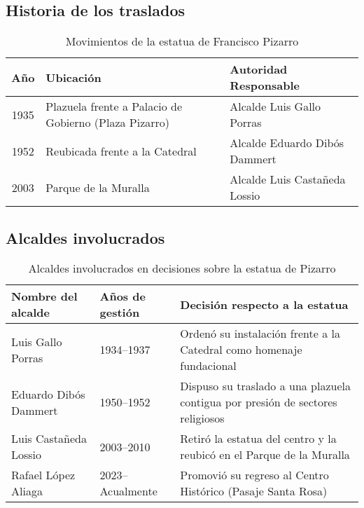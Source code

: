 \documentclass[a4paper,12pt]{article}
\begin{document}
	\subsection{Historia de los traslados}
	
	\begin{table}[htbp]
		\centering
		\caption{Movimientos de la estatua de Francisco Pizarro}
		\begin{tabularx}{\textwidth}{|c|X|X|}
			\hline
			\textbf{Año} & \textbf{Ubicación} & \textbf{Autoridad Responsable} \\
			\hline
			1935 & Plazuela frente a Palacio de Gobierno (Plaza Pizarro) & Alcalde Luis Gallo Porras \\
			\hline
			1952 & Reubicada frente a la Catedral & Alcalde Eduardo Dibós Dammert \\
			\hline
			2003 & Parque de la Muralla & Alcalde Luis Castañeda Lossio \\
			\hline
		\end{tabularx}
		\label{tab:movimientos-pizarro}
	\end{table}
	
	
	\clearpage
	
	\subsection{Alcaldes involucrados}
	
\begin{table}[htbp]
	\centering
	\caption{Alcaldes involucrados en decisiones sobre la estatua de Pizarro}
	\label{tab:alcaldes-pizarro}
	\begin{tabularx}{\textwidth}{|X|X|X|}
		\hline
		\textbf{Nombre del alcalde} & \textbf{Años de gestión} & \textbf{Decisión respecto a la estatua} \\
		\hline
		Luis Gallo Porras & 1934–1937 & Ordenó su instalación frente a la Catedral como homenaje fundacional \\
		\hline
		Eduardo Dibós Dammert & 1950–1952 & Dispuso su traslado a una plazuela contigua por presión de sectores religiosos \\
		\hline
		Luis Castañeda Lossio & 2003–2010 & Retiró la estatua del centro y la reubicó en el Parque de la Muralla \\
		\hline
		Rafael López Aliaga & 2023– Acualmente & Promovió su regreso al Centro Histórico (Pasaje Santa Rosa) \\
		\hline
	\end{tabularx}
\end{table}
\end{document}
